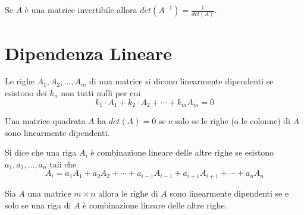 \begin{theorem}
    Se $A$ è una matrice invertibile allora $det(A^{-1}) = \frac{1}{det(A)}$.
\end{theorem}

\section{Dipendenza Lineare}

Le righe $A_1, A_2, \ldots, A_m$ di una matrice si dicono linearmente dipendenti se esistono dei $k_n$ non tutti nulli per cui $$k_1 \cdot A_1 + k_2 \cdot A_2 + \cdots + k_m A_m = 0$$


\begin{property}
    Una matrice quadrata $A$ ha $det(A) = 0$ se e solo se le righe (o le colonne) di $A$ sono linearmente dipendenti.
\end{property}

\begin{definition}
    Si dice che una riga $A_i$ è combinazione lineare delle altre righe se esistono $a_1,a_2,\ldots,a_n$ tali che
    $$ A_i = a_1A_1 + a_2A_2 + \cdots + a_{i-1}A_{i-1} + a_{i+1}A_{i+1} + \cdots + a_nA_n$$
\end{definition}

\begin{theorem}
    Sia $A$ una matrice $m \times n$ allora le righe di $A$ sono linearmente dipendenti se e solo se una riga di $A$ è combinazione lineare delle altre righe.
\end{theorem}
